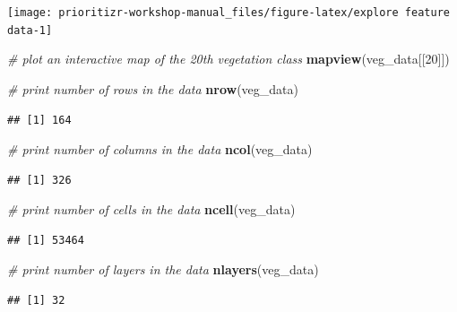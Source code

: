 \documentclass[12pt,]{book}
\newenvironment{Shaded}{\begin{snugshade}}{\end{snugshade}}
\newcommand{\KeywordTok}[1]{\textcolor[rgb]{0.13,0.29,0.53}{\textbf{#1}}}
\newcommand{\DecValTok}[1]{\textcolor[rgb]{0.00,0.00,0.81}{#1}}
\newcommand{\CommentTok}[1]{\textcolor[rgb]{0.56,0.35,0.01}{\textit{#1}}}
\newcommand{\NormalTok}[1]{#1}
\begin{document}
\begin{center}\texttt{[image: prioritizr-workshop-manual\_files/figure-latex/explore feature data-1]} \end{center}

\begin{Shaded}
\begin{Highlighting}[]
\CommentTok{# plot an interactive map of the 20th vegetation class}
\KeywordTok{mapview}\NormalTok{(veg_data[[}\DecValTok{20}\NormalTok{]])}
\end{Highlighting}
\end{Shaded}

\begin{Shaded}
\begin{Highlighting}[]
\CommentTok{# print number of rows in the data}
\KeywordTok{nrow}\NormalTok{(veg_data)}
\end{Highlighting}
\end{Shaded}

\begin{verbatim}
## [1] 164
\end{verbatim}

\begin{Shaded}
\begin{Highlighting}[]
\CommentTok{# print number of columns  in the data}
\KeywordTok{ncol}\NormalTok{(veg_data)}
\end{Highlighting}
\end{Shaded}

\begin{verbatim}
## [1] 326
\end{verbatim}

\begin{Shaded}
\begin{Highlighting}[]
\CommentTok{# print number of cells in the data}
\KeywordTok{ncell}\NormalTok{(veg_data)}
\end{Highlighting}
\end{Shaded}

\begin{verbatim}
## [1] 53464
\end{verbatim}

\begin{Shaded}
\begin{Highlighting}[]
\CommentTok{# print number of layers in the data}
\KeywordTok{nlayers}\NormalTok{(veg_data)}
\end{Highlighting}
\end{Shaded}

\begin{verbatim}
## [1] 32
\end{verbatim}
\end{document}
